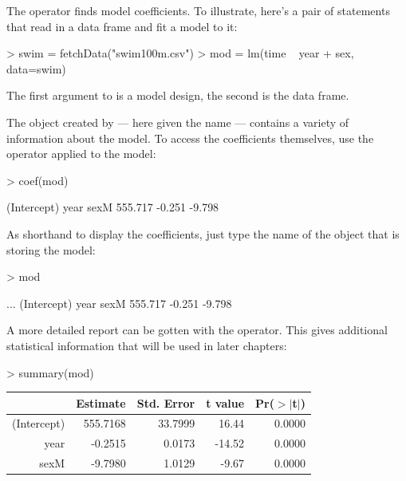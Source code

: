 

 
The  operator finds model coefficients. 
To illustrate,
here's a pair of statements that read in a data frame and fit a model
to it:
\begin{Schunk}
\begin{Sinput}
> swim = fetchData("swim100m.csv")
> mod = lm(time ~ year + sex, data=swim) 
\end{Sinput}
\end{Schunk}
The first argument to  is a model design, the second is the data frame.

\datasetSwimming

The object  created by  --- here given the name  --- contains a variety of
information about the model.
To access the coefficients themselves, use the 
operator applied to the model:
\begin{Schunk}
\begin{Sinput}
> coef(mod)
\end{Sinput}
\begin{Soutput}
(Intercept)        year        sexM 
    555.717      -0.251      -9.798 
\end{Soutput}
\end{Schunk}

As shorthand to display the coefficients, just type the
name of the object that is storing the model:
\begin{Schunk}
\begin{Sinput}
> mod
\end{Sinput}
\begin{Soutput}
...
(Intercept)         year         sexM  
    555.717       -0.251       -9.798  
\end{Soutput}
\end{Schunk}

A more detailed report can be gotten with the 
operator. 
 This gives additional statistical information
that will be used in later chapters:
\begin{Schunk}
\begin{Sinput}
> summary(mod)
\end{Sinput}
\end{Schunk}
\begin{tabular}{rrrrr}
  \hline
 & Estimate & Std. Error & t value & Pr($>$$|$t$|$) \\ 
  \hline
(Intercept) & 555.7168 & 33.7999 & 16.44 & 0.0000 \\ 
  year & -0.2515 & 0.0173 & -14.52 & 0.0000 \\ 
  sexM & -9.7980 & 1.0129 & -9.67 & 0.0000 \\ 
   \hline
\end{tabular}


